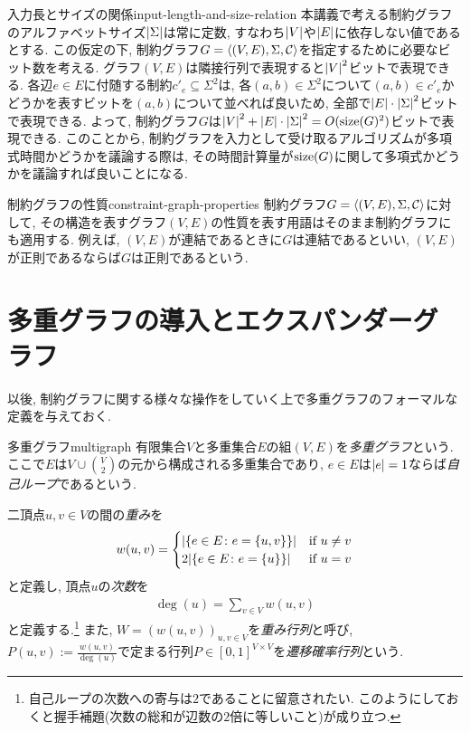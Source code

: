 \begin{remark}{入力長とサイズの関係}{input-length-and-size-relation}
  本講義で考える制約グラフのアルファベットサイズ$\abs{\Sigma}$は常に定数, すなわち$\abs{V}$や$\abs{E}$に依存しない値であるとする.
  この仮定の下, 制約グラフ$G=\langle(V,E),\Sigma,\mathcal{C}\rangle$を指定するために必要なビット数を考える.
  グラフ$(V,E)$は隣接行列で表現すると$\abs{V}^2$ビットで表現できる.
  各辺$e\in E$に付随する制約$c'_e\subseteq\Sigma^2$は, 各$(a,b)\in\Sigma^2$について$(a,b)\in c'_e$かどうかを表すビットを$(a,b)$について並べれば良いため, 全部で$\abs{E}\cdot\abs{\Sigma}^2$ビットで表現できる.
  よって, 制約グラフ$G$は$\abs{V}^2+\abs{E}\cdot\abs{\Sigma}^2 = O(\mathrm{size}(G)^2)$ビットで表現できる.
  このことから, 制約グラフを入力として受け取るアルゴリズムが多項式時間かどうかを議論する際は, その時間計算量が$\mathrm{size}(G)$に関して多項式かどうかを議論すれば良いことになる.
\end{remark}

\begin{remark}{制約グラフの性質}{constraint-graph-properties}
  制約グラフ$G=\langle(V,E),\Sigma,\mathcal{C}\rangle$に対して, その構造を表すグラフ$(V,E)$の性質を表す用語はそのまま制約グラフにも適用する.
  例えば, $(V,E)$が連結であるときに$G$は連結であるといい, $(V,E)$が正則であるならば$G$は正則であるという.
\end{remark}

\section{多重グラフの導入とエクスパンダーグラフ}

以後, 制約グラフに関する様々な操作をしていく上で多重グラフのフォーマルな定義を与えておく.

\begin{definition}{多重グラフ}{multigraph}
有限集合$V$と多重集合$E$の組$(V,E)$を\emph{多重グラフ}という.
ここで$E$は$V\cup \binom{V}{2}$の元から構成される多重集合であり, $e\in E$は$\abs{e}=1$ならば\emph{自己ループ}であるという.

二頂点$u,v\in V$の間の\emph{重み}を
\begin{align*}
  w(u,v) = \begin{cases}
   \abs{\qty{e\in E \colon e = \{u,v\}}} & \text{if } u\ne v \\
   2\abs{\qty{e\in E \colon e = \{u\}}} & \text{if } u=v
  \end{cases}
\end{align*}
と定義し, 頂点$u$の\emph{次数}を
\begin{align*}
  \deg(u) = \sum_{v\in V} w(u,v)
\end{align*}
と定義する.\footnote{自己ループの次数への寄与は$2$であることに留意されたい. このようにしておくと握手補題(次数の総和が辺数の$2$倍に等しいこと)が成り立つ.} また, $W=(w(u,v))_{u,v\in V}$を\emph{重み行列}と呼び, 
$P(u,v):=\frac{w(u,v)}{\deg(u)}$で定まる行列$P\in[0,1]^{V\times V}$を\emph{遷移確率行列}という.

\end{definition}

